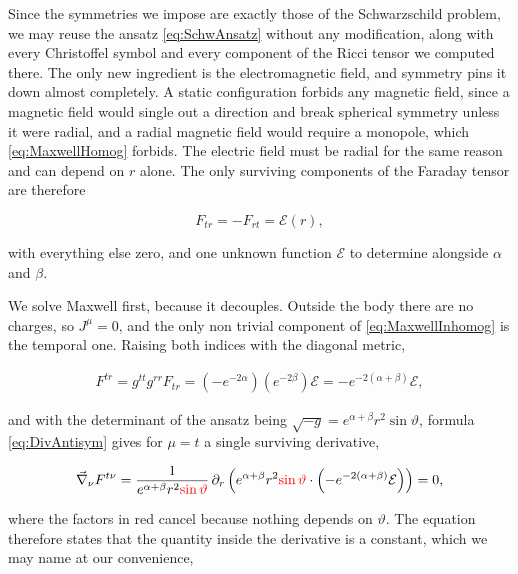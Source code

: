         Since the symmetries we impose are exactly those of the Schwarzschild problem, we may reuse the ansatz \ref{eq:SchwAnsatz} without any modification, along with every Christoffel symbol and every component of the Ricci tensor we computed there. The only new ingredient is the electromagnetic field, and symmetry pins it down almost completely. A static configuration forbids any magnetic field, since a magnetic field would single out a direction and break spherical symmetry unless it were radial, and a radial magnetic field would require a monopole, which \ref{eq:MaxwellHomog} forbids. The electric field must be radial for the same reason and can depend on $r$ alone. The only surviving components of the Faraday tensor are therefore

        \begin{equation}\label{eq:RNFieldAnsatz}
            F_{tr} = -F_{rt} = \mathcal{E}(r),
        \end{equation}

        with everything else zero, and one unknown function $\mathcal{E}$ to determine alongside $\alpha$ and $\beta$.

        We solve Maxwell first, because it decouples. Outside the body there are no charges, so $J^{\mu}=0$, and the only non trivial component of \ref{eq:MaxwellInhomog} is the temporal one. Raising both indices with the diagonal metric,

        \begin{align*}
            F^{tr} = g^{tt}g^{rr}F_{tr} = \left(-e^{-2\alpha}\right)\left(e^{-2\beta}\right)\mathcal{E} = -e^{-2(\alpha+\beta)}\mathcal{E},
        \end{align*}

        and with the determinant of the ansatz being $\sqrt{-g} = e^{\alpha+\beta}r^2\sin\vartheta$, formula \ref{eq:DivAntisym} gives for $\mu=t$ a single surviving derivative,

        \begin{align*}
            \Vec{\nabla}_{\nu}F^{t\nu} = \frac{1}{e^{\alpha+\beta}r^2{\color{red}\sin\vartheta}}\,\partial_r\left(e^{\alpha+\beta}r^2{\color{red}\sin\vartheta}\cdot\left(-e^{-2(\alpha+\beta)}\mathcal{E}\right)\right) = 0,
        \end{align*}

        where the factors in red cancel because nothing depends on $\vartheta$. The equation therefore states that the quantity inside the derivative is a constant, which we may name at our convenience,

